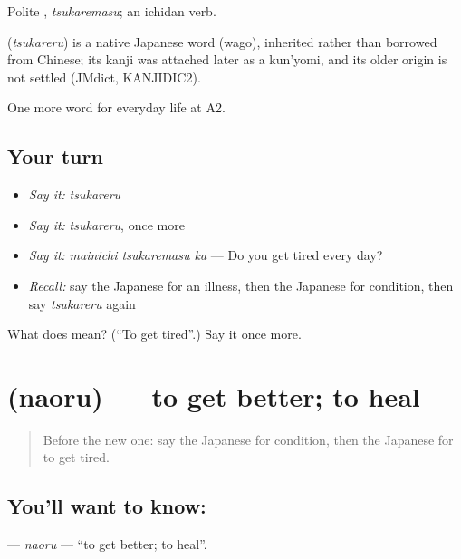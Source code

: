 Polite \textbf{}, \emph{tsukaremasu}; an ichidan verb.

\begin{cousinweb}
\textbf{} (\emph{tsukareru}) is a native Japanese word (wago), inherited rather than borrowed from Chinese; its kanji was attached later as a kun'yomi, and its older origin is not settled (JMdict, KANJIDIC2).
\end{cousinweb}

\begin{grammarlens}[title={What you've built}]
One more word for everyday life at A2.
\end{grammarlens}

\subsection*{Your turn}
\begin{itemize}
\raggedright
  \item \emph{Say it:} \emph{tsukareru}
  \item \emph{Say it:} \emph{tsukareru}, once more
  \item \emph{Say it:} \emph{mainichi tsukaremasu ka} — Do you get tired every day?
  \item \emph{Recall:} say the Japanese for an illness, then the Japanese for condition, then say \emph{tsukareru} again
\end{itemize}

\begin{tcolorbox}[breakable,colback=teal!4,colframe=teal!35!black,title={Before you move on}]
What does  mean? (\textquotedblleft{}To get tired\textquotedblright{}.) Say it once more.
\end{tcolorbox}
\section[\texorpdfstring{\ja{なおる} (naoru)}{なおる (naoru)}]{ (naoru) — to get better; to heal}

\label{lesson:JA-C216-naoru}



\begin{quote}
Before the new one: say the Japanese for condition, then the Japanese for to get tired.
\end{quote}

\subsection*{You'll want to know: }
\textbf{} — \emph{naoru} — \textquotedblleft{}to get better; to heal\textquotedblright{}.

